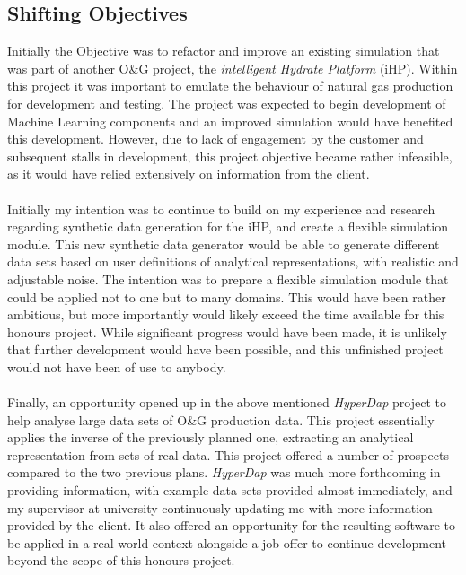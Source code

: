 \documentclass[main.tex]{subfiles}
\begin{document}
    \subsection{Shifting Objectives}
  
      Initially the Objective was to refactor and improve an existing simulation that was part of another O\&G  project, the \textit{intelligent Hydrate Platform} (iHP). Within this project it was important to emulate the behaviour of natural gas production for development and testing. The project was expected to begin development of Machine Learning components and an improved simulation would have benefited this development. However, due to lack of engagement by the customer and subsequent stalls in development, this project objective became rather infeasible, as it would have relied extensively on information from the client.
      \\\\
      Initially my intention was to continue to build on my experience and research regarding synthetic data generation for the iHP, and create a flexible simulation module. This new synthetic data generator would be able to generate different data sets based on user definitions of analytical representations, with realistic and adjustable noise. The intention was to prepare a flexible simulation module that could be applied not to one but to many domains. This would have been rather ambitious, but more importantly would likely exceed the time available for this honours project. While significant progress would have been made, it is unlikely that further development would have been possible, and this unfinished project would not have been of use to anybody.
      \\\\
      Finally, an opportunity opened up in the above mentioned \textit{HyperDap} project to help analyse large data sets of O\&G production data. This project essentially applies the inverse of the previously planned one, extracting an analytical representation from sets of real data. This project offered a number of prospects compared to the two previous plans. \textit{HyperDap} was much more forthcoming in providing information, with example data sets provided almost immediately, and my supervisor at university continuously updating me with more information provided by the client. It also offered an opportunity for the resulting software to be applied in a real world context alongside a job offer to continue development beyond the scope of this honours project.
    
\end{document}

